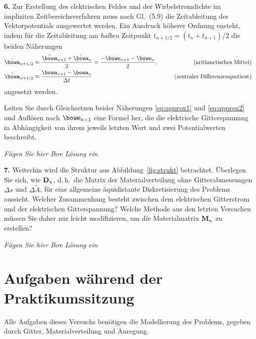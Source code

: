 \documentclass[Protokollheft.tex]{subfiles}
\begin{document}
\begin{framed}
	\noindent \textbf{6.}\label{loop}
      Zur Erstellung des elektrischen Feldes und der Wirbelstromdichte
      im impliziten Zeitbereichsverfahren muss nach Gl.~(5.9) die
      Zeitableitung des Vektorpotentials ausgewertet werden.
      Ein Ausdruck höherer Ordnung ensteht, indem für die
      Zeitableitung am \emph{halben} Zeitpunkt $t_{n+1/2}=(t_n+t_{n+1})/2$
      die beiden Näherungen
      \begin{align}\label{eq:approx1}
        \dot{\afit}_{n+1/2} &\approx \frac{\dot{\afit}_{n+1}+\dot{\afit}_n}{2} = \frac{-\efit_{n+1} - \efit_{n}}{2}, &\qquad\mbox{(arithmetisches Mittel)}\\
        \label{eq:approx2} \dot{\afit}_{n+1/2} &\approx \frac{\afit_{n+1} - \afit_{n}}{\Delta t} &\qquad\mbox{(zentraler Differenzenquotient)}
      \end{align}
      angesetzt werden.
    
      Leiten Sie durch Gleichsetzen beider Näherungen \eqref{eq:approx1} und \eqref{eq:approx2} und Auflösen nach
      $\efit_{n+1}$ eine Formel her, die die elektrische Gitterspannung
      in Abhängigkeit von ihrem jeweils letzten Wert und zwei
      Potentialwerten beschreibt.\label{exer:formulaEfit4pots}
\end{framed}

\emph{Fügen Sie hier Ihre Lösung ein}

\begin{framed}
	\noindent \textbf{7.} Weiterhin wird die Struktur aus Abbildung~\ref{fig:strukt} betrachtet. Überlegen Sie sich, wie
      $\mathbf{D}_{\upkappa}$, d.\,h.\ die Matrix der Materialverteilung ohne Gitterabmessungen $\Delta s$ und $\Delta \widetilde{A}$, für eine allgemeine äquidistante Diskretisierung des Problems aussieht. Welcher Zusammenhang besteht zwischen dem elektrischen Gitterstrom und der elektrischen Gitterspannung? Welche Methode aus den letzten Versuchen
      müssen Sie daher nur leicht modifizieren, um die Materialmatrix $\mathbf{M}_{\upkappa}$ zu erstellen?
      \label{exer:calcDkap}
\end{framed}

\emph{Fügen Sie hier Ihre Lösung ein}

\section{Aufgaben während der Praktikumssitzung}

    Alle Aufgaben dieses Versuchs benötigen die Modellierung des Problems, gegeben durch Gitter, Materialverteilung und Anregung.
\end{document}
